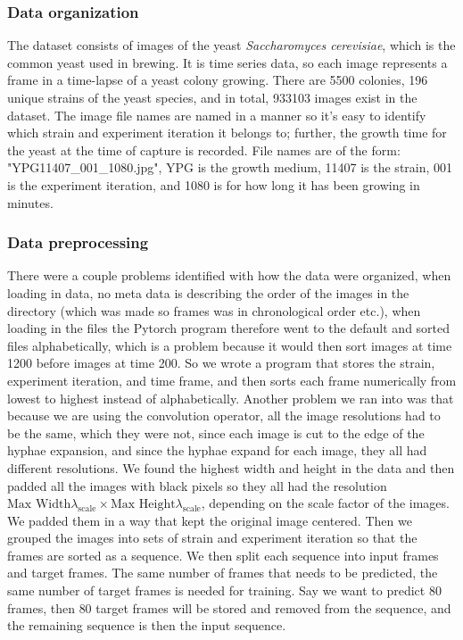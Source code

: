 \documentclass[a4paper,12pt]{article}
\begin{document}
\subsubsection{Data organization}
The dataset consists of images of the yeast \textit{Saccharomyces cerevisiae}, which is the common yeast used in brewing. It is time series data, so each image represents a frame in a time-lapse of a yeast colony growing. There are 5500 colonies, 196 unique strains of the yeast species, and in total, 933103 images exist in the dataset. The image file names are named in a manner so it's easy to identify which strain and experiment iteration it belongs to; further, the growth time for the yeast at the time of capture is recorded. File names are of the form: "YPG11407\_001\_1080.jpg", YPG is the growth medium, 11407 is the strain, 001 is the experiment iteration, and 1080 is for how long it has been growing in minutes.

\subsubsection{Data preprocessing}
There were a couple problems identified with how the data were organized, when loading in data, no meta data is describing the order of the images in the directory (which was made so frames was in chronological order etc.), when loading in the files the Pytorch program therefore went to the default and sorted files alphabetically, which is a problem because it would then sort images at time 1200 before images at time 200.
So we wrote a program that stores the strain, experiment iteration, and time frame, and then sorts each frame numerically from lowest to highest instead of alphabetically. Another problem we ran into was that because we are using the convolution operator, all the image resolutions had to be the same, which they were not, since each image is cut to the edge of the hyphae expansion, and since the hyphae expand for each image, they all had different resolutions.
We found the highest width and height in the data and then padded all the images with black pixels so they all had the resolution $\text{Max Width} \lambda_{\text{scale}} \times \text{Max Height} \lambda_{\text{scale}}$, depending on the scale factor of the images. We padded them in a way that kept the original image centered. Then we grouped the images into sets of strain and experiment iteration so that the frames are sorted as a sequence.
We then split each sequence into input frames and target frames. The same number of frames that needs to be predicted, the same number of target frames is needed for training. Say we want to predict $80$ frames, then $80$ target frames will be stored and removed from the sequence, and the remaining sequence is then the input sequence.
\end{document}
